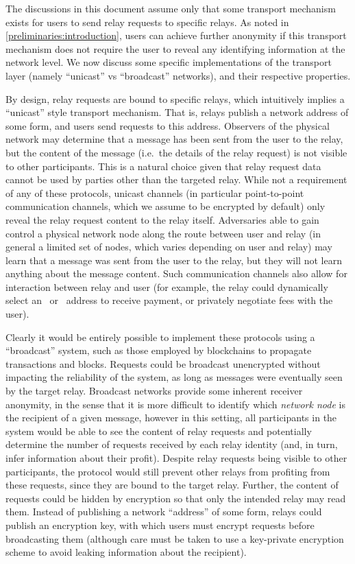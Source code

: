 The discussions in this document assume only that some transport mechanism exists for users to send relay requests to specific relays. As noted in \cref{preliminaries:introduction}, users can achieve further anonymity if this transport mechanism does not require the user to reveal any identifying information at the network level. We now discuss some specific implementations of the transport layer (namely ``unicast'' vs ``broadcast'' networks), and their respective properties.

By design, relay requests are bound to specific relays, which intuitively implies a ``unicast'' style transport mechanism. That is, relays publish a network address of some form, and users send requests to this address. Observers of the physical network may determine that a message has been sent from the user to the relay, but the content of the message (i.e.~the details of the relay request) is not visible to other participants. This is a natural choice given that relay request data cannot be used by parties other than the targeted relay. While not a requirement of any of these protocols, unicast channels (in particular point-to-point communication channels, which we assume to be encrypted by default) only reveal the relay request content to the relay itself. Adversaries able to gain control a physical network node along the route between user and relay (in general a limited set of nodes, which varies depending on user and relay) may learn that a message was sent from the user to the relay, but they will not learn anything about the message content. Such communication channels also allow for interaction between relay and user (for example, the relay could dynamically select an \ethereum~or \zeth~address to receive payment, or privately negotiate fees with the user).

Clearly it would be entirely possible to implement these protocols using a ``broadcast'' system, such as those employed by blockchains to propagate transactions and blocks. Requests could be broadcast unencrypted without impacting the reliability of the system, as long as messages were eventually seen by the target relay. Broadcast networks provide some inherent receiver anonymity, in the sense that it is more difficult to identify which \emph{network node} is the recipient of a given message, however in this setting, all participants in the system would be able to see the content of relay requests and potentially determine the number of requests received by each relay identity (and, in turn, infer information about their profit). Despite relay requests being visible to other participants, the protocol would still prevent other relays from profiting from these requests, since they are bound to the target relay. Further, the content of requests could be hidden by encryption so that only the intended relay may read them. Instead of publishing a network ``address'' of some form, relays could publish an encryption key, with which users must encrypt requests before broadcasting them (although care must be taken to use a key-private encryption scheme to avoid leaking information about the recipient).

